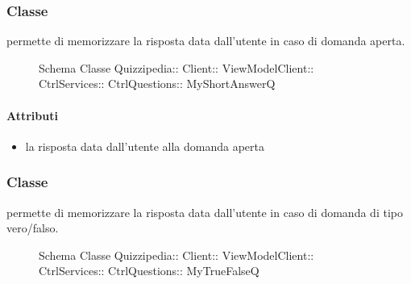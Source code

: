 \subsubsection{Classe }
permette di memorizzare la risposta data dall'utente in caso di domanda aperta.
\begin{figure}[H]
\centering
\noindent{}
\caption[Schema Classe MyShortAnswerQ]{Schema Classe Quizzipedia:: Client:: ViewModelClient:: CtrlServices:: CtrlQuestions:: MyShortAnswerQ}
\end{figure}
\paragraph{Attributi}
\begin{itemize}
\item {}
\newline
la risposta data dall'utente alla domanda aperta
\end{itemize}
\subsubsection{Classe }
permette di memorizzare la risposta data dall'utente in caso di domanda di tipo vero/falso.
\begin{figure}[H]
\centering
\noindent{}
\caption[Schema Classe MyTrueFalseQ]{Schema Classe Quizzipedia:: Client:: ViewModelClient:: CtrlServices:: CtrlQuestions:: MyTrueFalseQ}
\end{figure}
